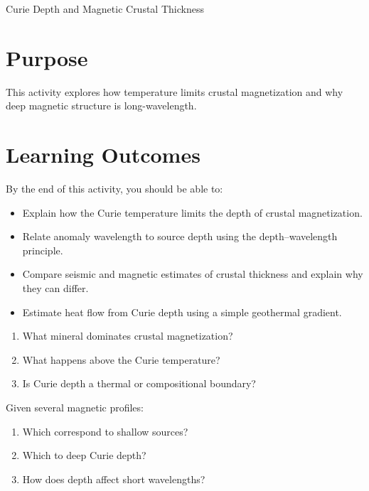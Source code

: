 \begin{activity}{Curie Depth and Magnetic Crustal Thickness}

\section*{Purpose}

This activity explores how temperature limits crustal magnetization and why deep magnetic structure is long-wavelength.

\section*{Learning Outcomes}

By the end of this activity, you should be able to:
\begin{itemize}
  \item Explain how the Curie temperature limits the depth of crustal magnetization.
  \item Relate anomaly wavelength to source depth using the depth--wavelength principle.
  \item Compare seismic and magnetic estimates of crustal thickness and explain why they can differ.
  \item Estimate heat flow from Curie depth using a simple geothermal gradient.
\end{itemize}

\begin{questions}
  \begin{enumerate}
    \item What mineral dominates crustal magnetization?
    \answerbox[1.5cm]
    \item What happens above the Curie temperature?
    \answerbox[2cm]
    \item Is Curie depth a thermal or compositional boundary?
    \answerbox[2cm]
  \end{enumerate}

  Given several magnetic profiles:

  \begin{enumerate}
    \item Which correspond to shallow sources?
    \answerbox[2cm]
    \item Which to deep Curie depth?
    \answerbox[2cm]
    \item How does depth affect short wavelengths?
    \answerbox[2cm]
  \end{enumerate}


\end{questions}
\end{activity}
